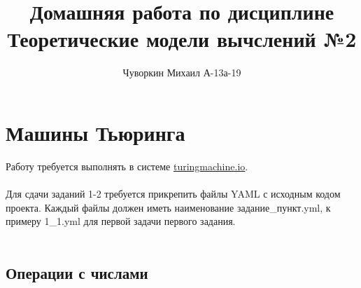 \documentclass[a4paper]{article}
\author{Чуворкин Михаил А-13а-19}
\title{Домашняя работа по дисциплине \\ Теоретические модели вычслений №2}
\begin{document}
\nocite{*}
\maketitle

\section{Машины Тьюринга}

Работу требуется выполнять в системе \url{turingmachine.io}. \\\\
Для сдачи заданий 1-2 требуется прикрепить файлы YAML с исходным кодом проекта. Каждый файлы должен иметь наименование задание\_пункт.yml, к примеру 1\_1.yml для первой задачи первого задания. \\\\

\subsection{Операции с числами}
\end{document}
